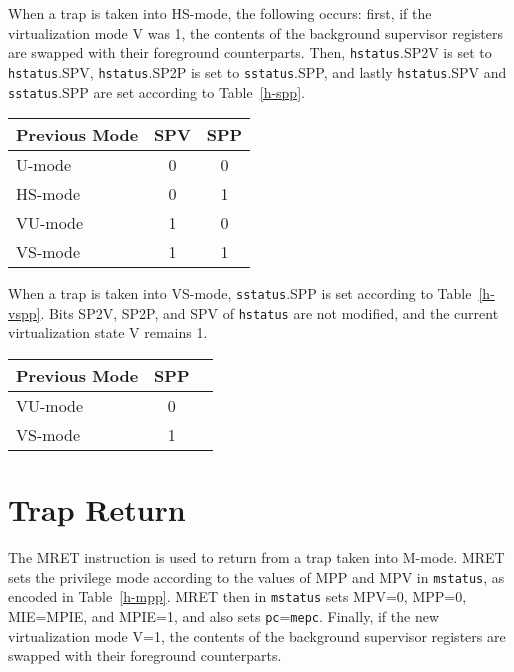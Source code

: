 When a trap is taken into HS-mode, the following occurs: first, if the
virtualization mode V was 1, the contents of the background supervisor
registers are swapped with their foreground counterparts.
Then, {\tt hstatus}.SP2V is set to {\tt hstatus}.SPV, {\tt hstatus}.SP2P is set
to {\tt sstatus}.SPP, and lastly {\tt hstatus}.SPV and {\tt sstatus}.SPP are
set according to Table~\ref{h-spp}.

\begin{table*}[h!]
\begin{center}
\begin{tabular}{|l|c|c|}
  \hline
  Previous Mode & SPV & SPP \\ \hline
  U-mode        & 0   & 0   \\
  HS-mode       & 0   & 1   \\ \hline
  VU-mode       & 1   & 0   \\
  VS-mode       & 1   & 1   \\ \hline
\end{tabular}
\end{center}
\caption{Value of {\tt hstatus} field SPV and {\tt sstatus} field SPP after a trap into HS-mode.}
\label{h-spp}
\end{table*}

When a trap is taken into VS-mode, {\tt sstatus}.SPP is set according to
Table~\ref{h-vspp}.
Bits SP2V, SP2P, and SPV of {\tt hstatus} are not modified, and the current
virtualization state V remains 1.

\begin{table*}[h!]
\begin{center}
\begin{tabular}{|l|c|c|}
  \hline
  Previous Mode & SPP \\ \hline
  VU-mode       & 0   \\
  VS-mode       & 1   \\ \hline
\end{tabular}
\end{center}
\caption{Value of {\tt sstatus} field SPP after a trap into VS-mode.}
\label{h-vspp}
\end{table*}

\section{Trap Return}

The MRET instruction is used to return from a trap taken into M-mode.
MRET sets the privilege mode according to the values of MPP and MPV in
{\tt mstatus}, as encoded in Table~\ref{h-mpp}.
MRET then in {\tt mstatus} sets MPV=0, MPP=0, MIE=MPIE, and MPIE=1, and also
sets {\tt pc}={\tt mepc}.
Finally, if the new virtualization mode V=1, the contents of the background
supervisor registers are swapped with their foreground counterparts.

